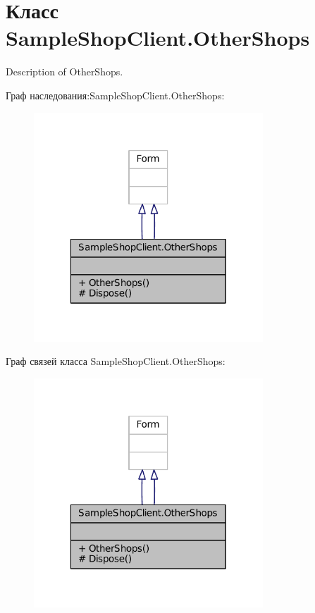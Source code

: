 \hypertarget{class_sample_shop_client_1_1_other_shops}{}\section{Класс Sample\+Shop\+Client.\+Other\+Shops}
\label{class_sample_shop_client_1_1_other_shops}


Description of Other\+Shops.  




Граф наследования\+:Sample\+Shop\+Client.\+Other\+Shops\+:
\nopagebreak
\begin{figure}[H]
\begin{center}
\leavevmode
\includegraphics[width=244pt]{class_sample_shop_client_1_1_other_shops__inherit__graph}
\end{center}
\end{figure}


Граф связей класса Sample\+Shop\+Client.\+Other\+Shops\+:
\nopagebreak
\begin{figure}[H]
\begin{center}
\leavevmode
\includegraphics[width=244pt]{class_sample_shop_client_1_1_other_shops__coll__graph}
\end{center}
\end{figure}
